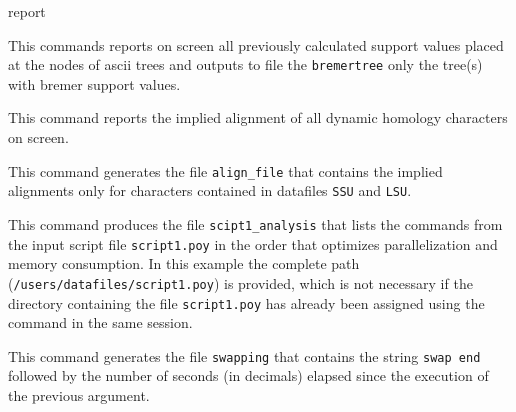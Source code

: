 \begin{command}{report}{}
\begin{poyexamples}
         {This commands reports on screen all previously calculated support values
         placed at the nodes of ascii trees and outputs to file the \texttt{bremertree}
         only the tree(s) with bremer support values.}
         
         {This command reports the implied alignment of all dynamic homology
         characters on screen.}
         
          {This command generates the file \texttt{align\_file} that contains
          the implied alignments only for characters contained in datafiles
          \texttt{SSU} and \texttt{LSU}.}
          
          {This command produces the file \texttt{scipt1\_analysis} that lists the commands from
          the input script file \texttt{script1.poy} in the order that optimizes parallelization and
          memory consumption. In this example the complete path (\texttt{/users/datafiles/script1.poy})
          is provided, which is not necessary if the directory containing the file \texttt{script1.poy}
          has already been assigned using the command  in the same \poy session.}
          
          {This command generates the file \texttt{swapping} that contains
          the string \texttt{swap end} followed by the number of seconds (in
          decimals) elapsed since the execution of the previous 
          argument.}

	\end{poyexamples}

	\begin{poyalso}
	 \end{poyalso}

\end{command}

